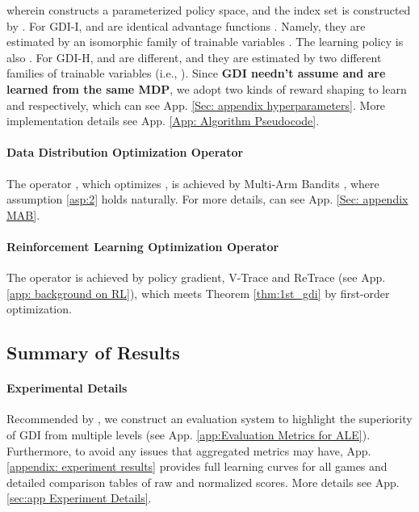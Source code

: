 \documentclass[nohyperref]{article}
\theoremstyle{plain}
\begin{document}
wherein  constructs a parameterized policy space, and the index set  is constructed by .
For GDI-I,  and  are identical advantage functions \citep{dueling_q}. Namely, they are estimated by an isomorphic family of trainable variables .
The learning policy is also .
For GDI-H,   and  are different, and they are estimated by two different families of trainable variables (i.e., ).
Since \textbf{GDI needn't assume  and  are learned from the same MDP}, we adopt two kinds of reward shaping to learn  and  respectively, which  can see App. \ref{Sec: appendix hyperparameters}.
More implementation details see App. \ref{App: Algorithm Pseudocode}.

\paragraph{Data Distribution Optimization Operator} The operator , which optimizes ,  is achieved by Multi-Arm Bandits \citep[MAB]{sutton}, 
where assumption \eqref{asp:2} holds naturally.
For more details, can see App. \ref{Sec: appendix MAB}. 


\paragraph{Reinforcement Learning  Optimization Operator}  The operator  is achieved by policy gradient, V-Trace and ReTrace \citep{impala, retrace} (see App. \ref{app: background on RL}), which meets Theorem \ref{thm:1st_gdi} by first-order optimization. 

\subsection{Summary of Results}
\label{sec: Summary of Results}





\paragraph{Experimental Details} Recommended by \citep{agent57,atarihuman}, we construct an evaluation system to highlight the superiority of GDI from multiple levels (see App. \ref{app:Evaluation Metrics for ALE}). Furthermore, to avoid any issues that aggregated metrics may have, App. \ref{appendix: experiment results} provides full learning curves for all games and detailed comparison tables of raw and normalized scores. More details see App. \ref{sec:app Experiment Details}.
\end{document}
